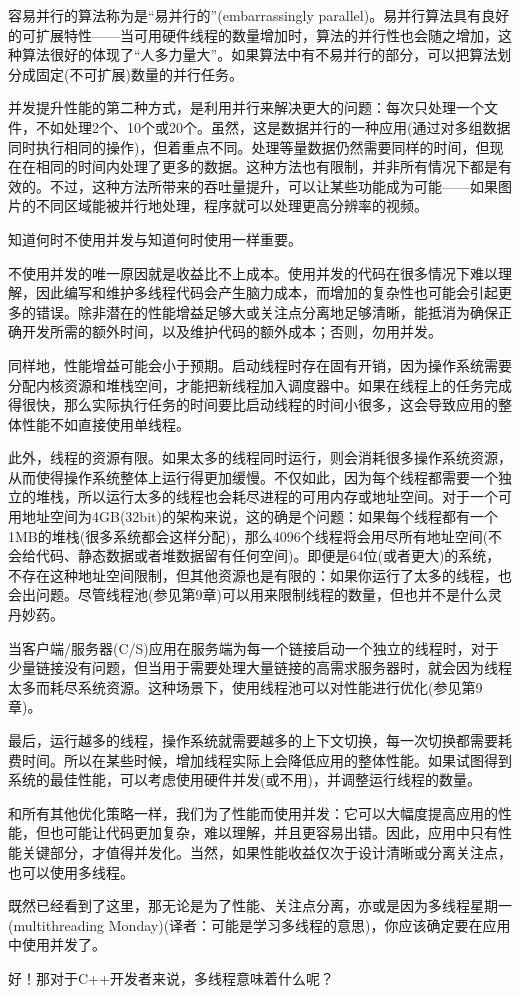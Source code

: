 容易并行的算法称为是“易并行的”(embarrassingly parallel)。易并行算法具有良好的可扩展特性——当可用硬件线程的数量增加时，算法的并行性也会随之增加，这种算法很好的体现了“人多力量大”。如果算法中有不易并行的部分，可以把算法划分成固定(不可扩展)数量的并行任务。

并发提升性能的第二种方式，是利用并行来解决更大的问题：每次只处理一个文件，不如处理2个、10个或20个。虽然，这是数据并行的一种应用(通过对多组数据同时执行相同的操作)，但着重点不同。处理等量数据仍然需要同样的时间，但现在在相同的时间内处理了更多的数据。这种方法也有限制，并非所有情况下都是有效的。不过，这种方法所带来的吞吐量提升，可以让某些功能成为可能——如果图片的不同区域能被并行地处理，程序就可以处理更高分辨率的视频。


知道何时不使用并发与知道何时使用一样重要。

不使用并发的唯一原因就是收益比不上成本。使用并发的代码在很多情况下难以理解，因此编写和维护多线程代码会产生脑力成本，而增加的复杂性也可能会引起更多的错误。除非潜在的性能增益足够大或关注点分离地足够清晰，能抵消为确保正确开发所需的额外时间，以及维护代码的额外成本；否则，勿用并发。

同样地，性能增益可能会小于预期。启动线程时存在固有开销，因为操作系统需要分配内核资源和堆栈空间，才能把新线程加入调度器中。如果在线程上的任务完成得很快，那么实际执行任务的时间要比启动线程的时间小很多，这会导致应用的整体性能不如直接使用单线程。

此外，线程的资源有限。如果太多的线程同时运行，则会消耗很多操作系统资源，从而使得操作系统整体上运行得更加缓慢。不仅如此，因为每个线程都需要一个独立的堆栈，所以运行太多的线程也会耗尽进程的可用内存或地址空间。对于一个可用地址空间为4GB(32bit)的架构来说，这的确是个问题：如果每个线程都有一个1MB的堆栈(很多系统都会这样分配)，那么4096个线程将会用尽所有地址空间(不会给代码、静态数据或者堆数据留有任何空间)。即便是64位(或者更大)的系统，不存在这种地址空间限制，但其他资源也是有限的：如果你运行了太多的线程，也会出问题。尽管线程池(参见第9章)可以用来限制线程的数量，但也并不是什么灵丹妙药。

当客户端/服务器(C/S)应用在服务端为每一个链接启动一个独立的线程时，对于少量链接没有问题，但当用于需要处理大量链接的高需求服务器时，就会因为线程太多而耗尽系统资源。这种场景下，使用线程池可以对性能进行优化(参见第9章)。

最后，运行越多的线程，操作系统就需要越多的上下文切换，每一次切换都需要耗费时间。所以在某些时候，增加线程实际上会降低应用的整体性能。如果试图得到系统的最佳性能，可以考虑使用硬件并发(或不用)，并调整运行线程的数量。

和所有其他优化策略一样，我们为了性能而使用并发：它可以大幅度提高应用的性能，但也可能让代码更加复杂，难以理解，并且更容易出错。因此，应用中只有性能关键部分，才值得并发化。当然，如果性能收益仅次于设计清晰或分离关注点，也可以使用多线程。

既然已经看到了这里，那无论是为了性能、关注点分离，亦或是因为多线程星期一(multithreading Monday)(译者：可能是学习多线程的意思)，你应该确定要在应用中使用并发了。

好！那对于C++开发者来说，多线程意味着什么呢？

